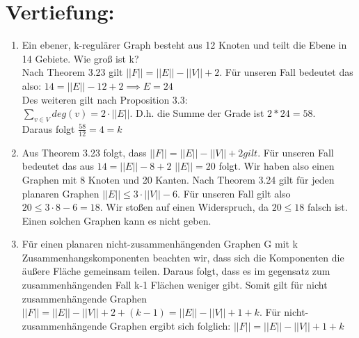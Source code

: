 

\usepackage{wrapfig}

    \maketitle
    \section*{Vertiefung:}
    \begin{enumerate}[label=(\alph*)]
        \item  Ein ebener,
        k-regulärer Graph besteht aus
        12 Knoten und teilt die Ebene in
        14 Gebiete. Wie groß ist k? \\
        Nach Theorem 3.23 gilt $||F|| = ||E|| - ||V|| + 2$. Für unseren Fall bedeutet das also:
        $14 = ||E|| - 12 + 2 \implies E = 24$ \\
        Des weiteren gilt nach Proposition 3.3: \\
        $\sum_{v \in V} deg(v) = 2 \cdot ||E||$. D.h. die Summe der Grade ist $2 * 24 = 58$. \\
        Daraus folgt $\frac{58}{12} = 4 = k$
        
        \item Aus Theorem 3.23 folgt, dass $||F|| = ||E|| - ||V|| + 2 gilt $. Für unseren Fall bedeutet 
        das aus $ 14 = ||E|| - 8 + 2 $ $ ||E|| = 20 $ folgt. Wir haben also einen Graphen mit 8 Knoten 
        und 20 Kanten. Nach Theorem 3.24 gilt für jeden planaren Graphen $ ||E|| \leq 3 \cdot ||V|| - 6$. 
        Für unseren Fall gilt also $20 \leq 3 \cdot 8 - 6  = 18$.
        Wir stoßen auf einen Widerspruch, da $20 \leq 18$ falsch ist. Einen solchen Graphen kann es nicht geben.
        
        \item Für einen planaren nicht-zusammenhängenden Graphen G mit k Zusammenhangskomponenten beachten 
        wir, dass sich die Komponenten die äußere Fläche gemeinsam teilen. Daraus folgt, dass es im gegensatz 
        zum zusammenhängenden Fall k-1 Flächen weniger gibt. Somit gilt für nicht zusammenhängende Graphen 
        $||F|| = ||E|| - ||V|| + 2 + (k-1) = ||E|| - ||V|| + 1 + k$. Für nicht-zusammenhängende Graphen 
        ergibt sich folglich: $||F|| = ||E|| - ||V|| + 1 + k $
       

\end{enumerate}
